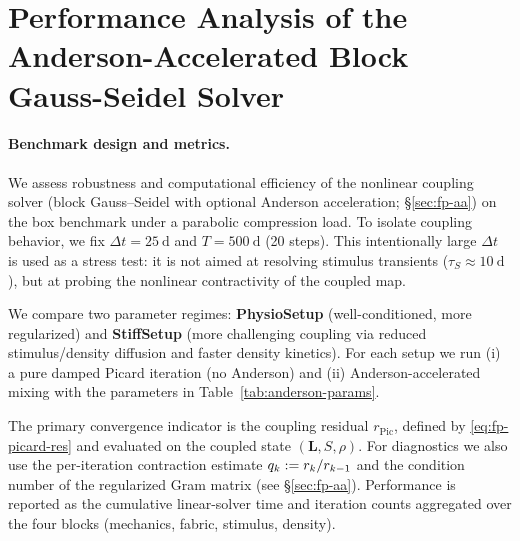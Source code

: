 \section*{Performance Analysis of the Anderson-Accelerated Block Gauss-Seidel Solver}
\label{sec:fp-aa-performance}

\paragraph{Benchmark design and metrics.}
We assess robustness and computational efficiency of the nonlinear coupling solver (block Gauss--Seidel with optional Anderson acceleration; \S\ref{sec:fp-aa}) on the box benchmark under a parabolic compression load.
To isolate coupling behavior, we fix $\Delta t=25~\mathrm{d}$ and $T=500~\mathrm{d}$ (20 steps).
This intentionally large $\Delta t$ is used as a stress test: it is not aimed at resolving stimulus transients ($\tau_S\approx 10~\mathrm{d}$), but at probing the nonlinear contractivity of the coupled map.

We compare two parameter regimes:
\textbf{PhysioSetup} (well-conditioned, more regularized) and \textbf{StiffSetup} (more challenging coupling via reduced stimulus/density diffusion and faster density kinetics).
For each setup we run (i) a pure damped Picard iteration (no Anderson) and (ii) Anderson-accelerated mixing with the parameters in Table~\ref{tab:anderson-params}.

The primary convergence indicator is the coupling residual $r_{\mathrm{Pic}}$, defined by \eqref{eq:fp-picard-res} and evaluated on the coupled state $(\mathbf{L},S,\rho)$.
For diagnostics we also use the per-iteration contraction estimate $q_k:=r_k/r_{k-1}$ and the condition number of the regularized Gram matrix (see \S\ref{sec:fp-aa}).
Performance is reported as the cumulative linear-solver time and iteration counts aggregated over the four blocks (mechanics, fabric, stimulus, density).

